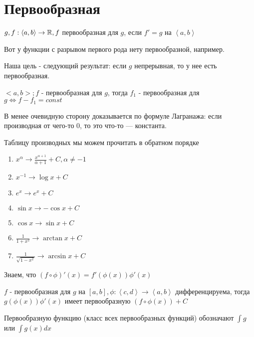 \documentclass[12pt]{report}
\begin{document}
\section{Первообразная}

\begin{defn}
$g, f: \left<a, b\right> \to \mathbb{R}, f$ первообразная для $g$, если $f' = g$ на $\left<a, b\right>$
\end{defn}

\begin{note}
Вот у функции с разрывом первого рода нету первообразной, например.

Наша цель - следующий результат: если $g$ непрерывная, то у нее есть первообразная.
\end{note}

\begin{thm}
$<a, b>; f$ - первообразная для $g$, тогда $f_1$ - первообразная для $g \Leftrightarrow f - f_1 = const$

В менее очевидную сторону доказывается по формуле Лагранажа: если производная от чего-то $0$, то это что-то --- константа.
\end{thm}

\begin{st}
Таблицу производных мы можем прочитать в обратном порядке
\begin{enumerate}
\item $x^\alpha \to \frac{x^{\alpha + 1}}{\alpha + 1} + C, \alpha \neq -1$
\item $x^{-1} \to \log{x} + C$
\item $e^x \to e^x + C$
\item $\sin{x} \to -\cos{x} + C$
\item $\cos{x} \to \sin{x} + C$
\item $\frac{1}{1 + x^2} \to \arctan{x} + C$
\item $\frac{1}{\sqrt{1 - x^2}} \to \arcsin{x} + C$
\end{enumerate}
\end{st}

\begin{st}
Знаем, что $(f \circ \phi)'(x) = f'(\phi(x))\phi'(x)$

$f$ - первообразная для $g$ на $[a, b], \phi: \left<c, d\right> \to \left<a, b\right>$ дифференцируема, тогда $g(\phi(x))\phi'(x)$ имеет первообразную $(f \circ \phi (x)) + C$
\end{st}

\begin{name}
Первообразную функцию (класс всех первообразных функций) обозначают $\int{g}$ или $\int{g(x)dx}$
\end{name}
\end{document}
